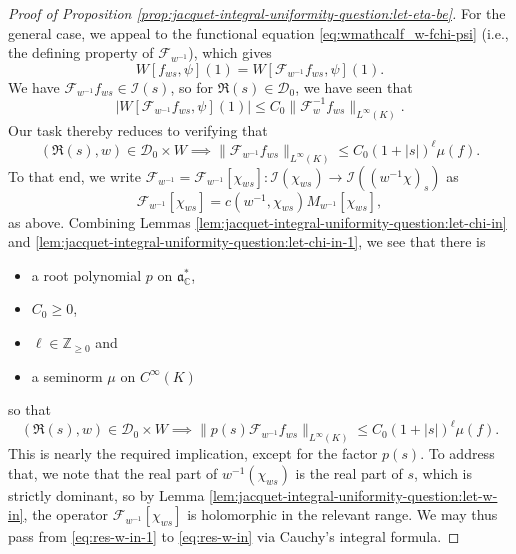 \documentclass[reqno]{amsart}
\theoremstyle{plain} \newtheorem{theorem} {Theorem}
\theoremstyle{definition} \newtheorem{definition} [theorem] {Definition}
\theoremstyle{itplain} %
\numberwithin{equation}{section}
\numberwithin{theorem}{section}
\renewcommand{\geq}{\geqslant}
\renewcommand{\leq}{\leqslant}
\begin{document}
\begin{proof}[Proof of Proposition \ref{prop:jacquet-integral-uniformity-question:let-eta-be}]
  For the general case, we appeal to the functional equation \eqref{eq:wmathcalf_w-fchi-psi} (i.e., the defining property of $\mathcal{F}_{w^{-1}}$), which gives
  \begin{equation*}
    W[f_{w s}, \psi](1)
    =
    W[\mathcal{F}_{w^{-1}} f_{w s}, \psi](1).
  \end{equation*}
  We have $\mathcal{F}_{w^{-1}} f_{w s} \in \mathcal{I}(s)$, so for $\Re(s) \in \mathcal{D}_0$, we have seen that
  \begin{equation*}
    |W[\mathcal{F}_{w^{-1}} f_{w s}, \psi](1)| \leq C_0 \|\mathcal{F}_w^{-1} f_{w s}\|_{L^\infty(K)}.
  \end{equation*}
  Our task thereby reduces to verifying that
  \begin{equation}\label{eq:res-w-in}
    (\Re(s), w) \in \mathcal{D}_0 \times W \implies \|\mathcal{F}_{w^{-1}} f_{w s}\|_{L^\infty(K)} \leq C_0 (1 + |s|)^{\ell} \mu(f).
  \end{equation}
  To that end, we write $\mathcal{F}_{w^{-1}} = \mathcal{F}_{w^{-1}}[\chi_{w s}] : \mathcal{I}(\chi_{w s}) \rightarrow \mathcal{I}((w^{-1} \chi)_{s})$ as
  \begin{equation*}
    \mathcal{F}_{w^{-1}}[\chi_{w s}] = c(w^{-1},\chi_{w s}) M_{w^{-1}}[\chi_{w s}],
  \end{equation*}
  as above.  Combining Lemmas \ref{lem:jacquet-integral-uniformity-question:let-chi-in} and \ref{lem:jacquet-integral-uniformity-question:let-chi-in-1}, we see that there is
  \begin{itemize}
  \item a root polynomial $p$ on $\mathfrak{a}_{\mathbb{C}}^*$, 
  \item $C_0 \geq 0$, 
  \item $\ell \in \mathbb{Z}_{\geq 0}$ and
  \item  a seminorm $\mu$ on $C^\infty(K)$ 
  \end{itemize}
  so that
  \begin{equation}\label{eq:res-w-in-1}
    (\Re(s), w) \in \mathcal{D}_0 \times W \implies \|p(s) \mathcal{F}_{w^{-1}} f_{w s}\|_{L^\infty(K)} \leq C_0 (1 + |s|)^{\ell} \mu(f).
  \end{equation}
  This is nearly the required implication, except for the factor $p(s)$.  To address that, we note that the real part of $w^{-1}  (\chi_{w s})$ is the real part of $s$, which is strictly dominant, so by Lemma \ref{lem:jacquet-integral-uniformity-question:let-w-in}, the operator $\mathcal{F}_{w^{-1}}[\chi_{w s}]$ is holomorphic in the relevant range.    We may thus pass from \eqref{eq:res-w-in-1} to \eqref{eq:res-w-in} via Cauchy's integral formula.
\end{proof}
\end{document}
